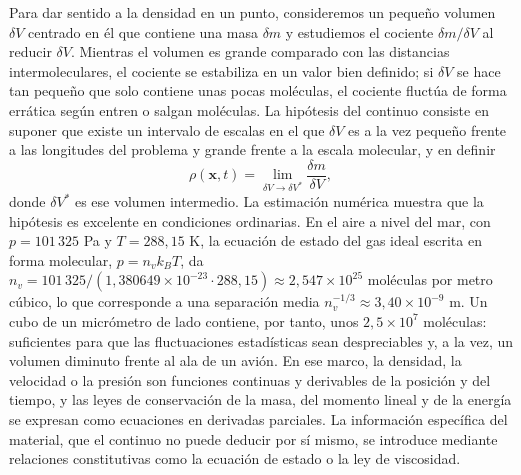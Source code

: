 \documentclass[10pt,openany]{book}
\begin{document}
Para dar sentido a la densidad en un punto, consideremos un pequeño volumen \(\delta V\) centrado en él que contiene una masa \(\delta m\) y estudiemos el cociente \(\delta m/\delta V\) al reducir \(\delta V\). Mientras el volumen es grande comparado con las distancias intermoleculares, el cociente se estabiliza en un valor bien definido; si \(\delta V\) se hace tan pequeño que solo contiene unas pocas moléculas, el cociente fluctúa de forma errática según entren o salgan moléculas. La hipótesis del continuo consiste en suponer que existe un intervalo de escalas en el que \(\delta V\) es a la vez pequeño frente a las longitudes del problema y grande frente a la escala molecular, y en definir
\begin{equation}
\rho(\mathbf{x}, t) = \lim_{\delta V \to \delta V^{*}} \frac{\delta m}{\delta V}, \label{eq:c03-densidad}
\end{equation}
donde \(\delta V^{*}\) es ese volumen intermedio. La estimación numérica muestra que la hipótesis es excelente en condiciones ordinarias. En el aire a nivel del mar, con \(p = 101\,325\) Pa y \(T = 288{,}15\) K, la ecuación de estado del gas ideal escrita en forma molecular, \(p = n_v k_B T\), da \(n_v = 101\,325/(1{,}380649\times 10^{-23}\cdot 288{,}15) \approx 2{,}547\times 10^{25}\) moléculas por metro cúbico, lo que corresponde a una separación media \(n_v^{-1/3} \approx 3{,}40\times 10^{-9}\) m. Un cubo de un micrómetro de lado contiene, por tanto, unos \(2{,}5\times 10^{7}\) moléculas: suficientes para que las fluctuaciones estadísticas sean despreciables y, a la vez, un volumen diminuto frente al ala de un avión. En ese marco, la densidad, la velocidad o la presión son funciones continuas y derivables de la posición y del tiempo, y las leyes de conservación de la masa, del momento lineal y de la energía se expresan como ecuaciones en derivadas parciales. La información específica del material, que el continuo no puede deducir por sí mismo, se introduce mediante relaciones constitutivas como la ecuación de estado o la ley de viscosidad.
\end{document}
